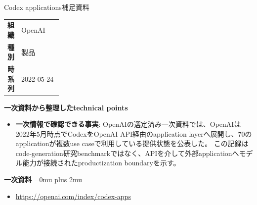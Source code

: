 \begin{technicalnote}{Codex applications}{補足資料}
\begingroup
\begin{tabularx}{\linewidth}{@{}>{\bfseries}p{0.22\linewidth}X@{}}
組織 & OpenAI \\
種別 & 製品 \\
時系列 & 2022-05-24 \\
\end{tabularx}
\smallskip
{\bfseries 一次資料から整理したtechnical points}
\begin{itemize}[leftmargin=1.5em,itemsep=0.35em]
\item \textbf{一次情報で確認できる事実}: OpenAIの選定済み一次資料では、OpenAIは2022年5月時点でCodexをOpenAI API経由のapplication layerへ展開し、70のapplicationが複数use caseで利用している提供状態を公表した。 この記録はcode-generation研究benchmarkではなく、APIを介して外部applicationへモデル能力が接続されたproductization boundaryを示す。
\end{itemize}
\begin{minipage}{\linewidth}
\begin{samepage}
{\bfseries 一次資料}
\begingroup\sloppy
\Urlmuskip=0mu plus 2mu\relax
\begin{itemize}[leftmargin=1.5em,itemsep=0.25em]
\item {\scriptsize\url{https://openai.com/index/codex-apps}}
\end{itemize}
\endgroup
\end{samepage}
\end{minipage}
\endgroup
\end{technicalnote}
\medskip

